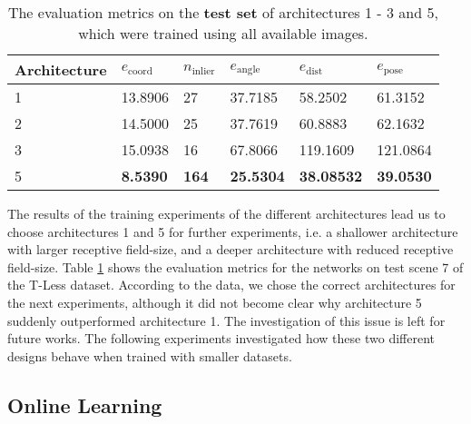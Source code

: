\begin{table}[b]
\centering
\begin{tabular}{|l||lllll|} \hline
Architecture & $e_{\text{coord}}$ & $n_{\text{inlier}}$ & $e_{\text{angle}}$ & $e_{\text{dist}}$ & $e_{\text{pose}}$ \\ \hline \hline \rowcolor{Gray}
1            & 13.8906   & 27   & 37.7185   & 58.2502  & 61.3152           \\ \hline
2            & 14.5000   & 25   & 37.7619   & 60.8883  & 62.1632           \\ \hline \rowcolor{Gray}
3            & 15.0938    & 16   & 67.8066   & 119.1609  & 121.0864            \\ \hline
5            & \textbf{8.5390}    & \textbf{164}   & \textbf{25.5304}   & \textbf{38.08532}  & \textbf{39.0530} \\ \hline       
\end{tabular}
\caption{The evaluation metrics on the \textbf{test set} of architectures 1 - 3 and 5, which were trained using all available images.}
\label{table:architecture_test_metrics_comparison}
\end{table}

The results of the training experiments of the different architectures lead us to choose architectures 1 and 5 for further experiments, i.e. a shallower architecture with larger receptive field-size, and a deeper architecture with reduced receptive field-size. Table \ref{table:architecture_test_metrics_comparison} shows the evaluation metrics for the networks on test scene 7 of the T-Less dataset. According to the data, we chose the correct architectures for the next experiments, although it did not become clear why architecture 5 suddenly outperformed architecture 1. The investigation of this issue is left for future works. The following experiments investigated how these two different designs behave when trained with smaller datasets.

\subsection{Online Learning} \label{subsection:experiments_online_learning}

